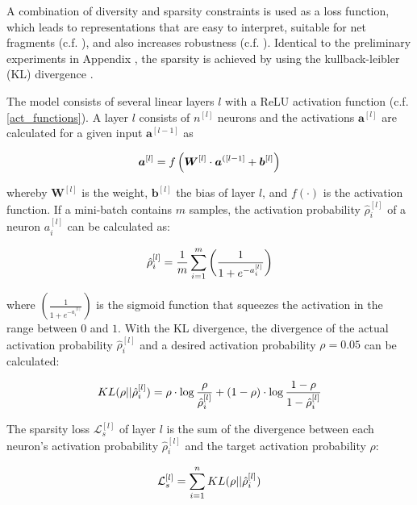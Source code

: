 A combination of diversity and sparsity constraints is used as a loss function, which leads to representations that are easy to interpret, suitable for net fragments (c.f. ), and also increases robustness (c.f. ).
Identical to the preliminary experiments in Appendix , the sparsity is achieved by using the kullback-leibler (KL) divergence .

The model consists of several linear layers $l$ with a ReLU activation function (c.f. \eqref{act_functions}).
A layer $l$ consists of $n^{[l]}$ neurons and the activations $\boldsymbol{a}^{[l]}$ are calculated for a given input $\boldsymbol{a}^{[l-1]}$ as

\begin{align}\eqlbl{vso_1}
		\boldsymbol{a}^{[l]} = f \left( \boldsymbol{W}^{[l]} \cdot \boldsymbol{a}^{([l-1]} + \boldsymbol{b}^{[l]} \right)
\end{align}

whereby $\boldsymbol{W}^{[l]}$ is the weight, $\boldsymbol{b}^{[l]}$ the bias of layer $l$, and $f(\cdot)$ is the activation function.
If a mini-batch contains $m$ samples, the activation probability $\hat{\rho}^{[l]}_i$ of a neuron $a^{[l]}_i$ can be calculated as:

\begin{align}\eqlbl{vso_2}
		\hat{\rho}^{[l]}_i= \frac{1}{m} \sum^m_{i=1} \left( \frac{1}{1+e^{-a^{[l]}_i}} \right)
\end{align}

where $\left( \frac{1}{1+e^{-a^{[l]}_i}} \right)$ is the sigmoid function that squeezes the activation in the range between $0$ and $1$.
With the KL divergence, the divergence of the actual activation probability $\hat{\rho}^{[l]}_i$ and a desired activation probability $\rho=0.05$ can be calculated:

\begin{align}\eqlbl{vso_3}
		KL(\rho || \hat{\rho}^{[l]}_i) = \rho \cdot \log \frac{\rho}{\hat{\rho}^{[l]}_i} + (1-\rho) \cdot \log \frac{1-\rho}{1-\hat{\rho}^{[l]}_i}
\end{align}

The sparsity loss $\mathcal{L}^{[l]}_{s}$ of layer $l$ is the sum of the divergence between each neuron's activation probability $\hat{\rho}^{[l]}_i$ and the target activation probability $\rho$:

\begin{align}\eqlbl{vso_4}
		\mathcal{L}^{[l]}_{s} = \sum_{i=1}^{n} KL(\rho || \hat{\rho}^{[l]}_i)
\end{align}

